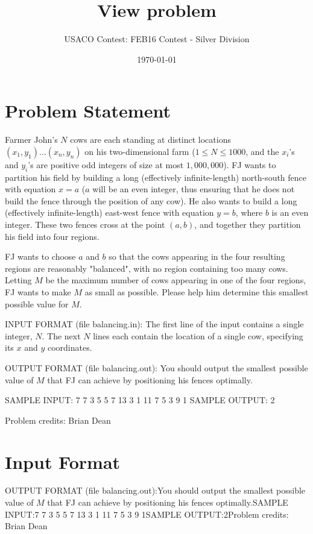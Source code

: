\documentclass[12pt]{article}
\title{View problem}
\author{USACO Contest: FEB16 Contest - Silver Division}
\date{\today}
\begin{document}
\maketitle

\section*{Problem Statement}

Farmer John's $N$ cows are each standing at distinct locations
$(x_1, y_1) \ldots (x_n, y_n)$ on his two-dimensional farm
($1 \leq N \leq 1000$, and the $x_i$'s and $y_i$'s are positive odd integers of
size at most $1,000,000$).  FJ wants to partition his field by building a  long
(effectively infinite-length) north-south fence with equation $x=a$ ($a$ will be
an even integer, thus ensuring that he does not build the fence through the
position of any cow). He also wants to build a long (effectively
infinite-length) east-west fence with equation $y=b$, where $b$ is an even
integer.  These two fences cross at the point $(a,b)$, and together they
partition his field into four regions.  

FJ wants to choose $a$ and $b$ so that the cows appearing in the four resulting
regions are reasonably "balanced", with no region containing too many cows. 
Letting $M$ be the maximum number of cows appearing in one of the four regions,
FJ wants to make $M$ as small as possible.  Please help him determine this
smallest possible value for $M$.

INPUT FORMAT (file balancing.in):
The first line of the input contains a single integer, $N$. The next $N$ lines
each contain the location of a single cow, specifying its $x$ and $y$
coordinates.

OUTPUT FORMAT (file balancing.out):
You should output the smallest possible value of $M$ that FJ can achieve by
positioning his fences optimally.

SAMPLE INPUT:
7
7 3
5 5
7 13
3 1
11 7
5 3
9 1
SAMPLE OUTPUT: 
2

Problem credits: Brian Dean



\section*{Input Format}
OUTPUT FORMAT (file balancing.out):You should output the smallest possible value of $M$ that FJ can achieve by
positioning his fences optimally.SAMPLE INPUT:7
7 3
5 5
7 13
3 1
11 7
5 3
9 1SAMPLE OUTPUT:2Problem credits: Brian Dean
\end{document}
